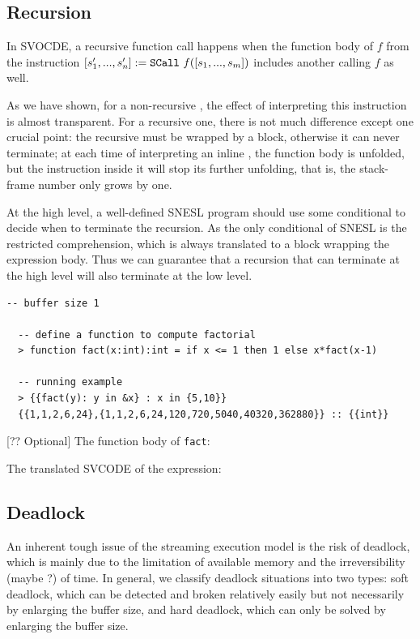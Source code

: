 \subsection{Recursion}

In SVOCDE, a recursive function call happens when the function body of $f$ from the instruction $\scall{f}{[s_1,...,s_m]}{[s_1',...,s_n']}$ includes another \sc 
calling  $f$ as well.

As we have shown, for a non-recursive \sc, the effect of interpreting this instruction is almost transparent. 
For a recursive one, there is not much difference except one crucial point: the recursive \sc must be wrapped by a \wc block, otherwise it can never terminate;
at each time of interpreting an inline \sc, the function body is unfolded, but the \wc instruction inside it will stop its further unfolding, that is, the stack-frame number only grows by one. 

At the high level, a well-defined SNESL program should use some conditional to decide when to terminate the recursion. 
As the only conditional of SNESL is the restricted comprehension, which is always translated to a \wc block wrapping the expression body.
Thus we can guarantee that a recursion that can terminate at the high level will also terminate at the low level. 


\begin{example}
\end{example}
\begin{lstlisting}[style=nesl-style]
  -- buffer size 1
  
  -- define a function to compute factorial
  > function fact(x:int):int = if x <= 1 then 1 else x*fact(x-1)
  
  -- running example
  > {{fact(y): y in &x} : x in {5,10}}
  {{1,1,2,6,24},{1,1,2,6,24,120,720,5040,40320,362880}} :: {{int}}
\end{lstlisting}


[?? Optional] The function body of  \texttt{fact}:
%

The translated SVCODE of the expression:




\subsection{Deadlock}
An inherent tough issue of the streaming execution model is the risk of deadlock, which is mainly due to the limitation of available memory and the irreversibility (maybe ?) of time.
In general, we classify deadlock situations into two types: soft deadlock, which can be detected and broken relatively easily but not necessarily by enlarging the buffer size, and hard deadlock, which can only be solved by enlarging the buffer size. 

